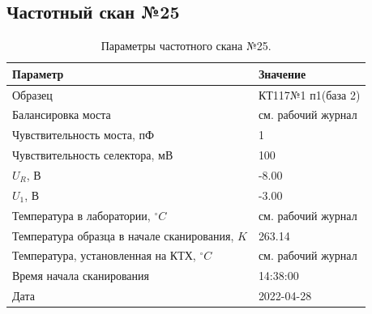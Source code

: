 \subsection{Частотный скан №25}
\begin{table}[!ht]
    \centering
    \caption{Параметры частотного скана №25.}
    \begin{tabular}{|l|l|}
        \hline
        Параметр                                       & Значение                  \\ \hline
        Образец                                        & КТ117№1 п1(база 2)        \\ \hline
        Балансировка моста                             & см. рабочий журнал        \\ \hline
        Чувствительность моста, пФ                     & 1                         \\ \hline
        Чувствительность селектора, мВ                 & 100                       \\ \hline
        $U_R$, В                                       & -8.00                     \\ \hline
        $U_1$, В                                       & -3.00                     \\ \hline
        Температура в лаборатории, $^\circ C$          & см. рабочий журнал        \\ \hline
        Температура образца в начале сканирования, $K$ & 263.14                    \\ \hline
        Температура, установленная на КТХ, $^\circ C$  & см. рабочий журнал        \\ \hline
        Время начала сканирования                      & 14:38:00                  \\ \hline
        Дата                                           & 2022-04-28                \\ \hline
    \end{tabular}
    \label{table:frequency_scan_25}
\end{table}

